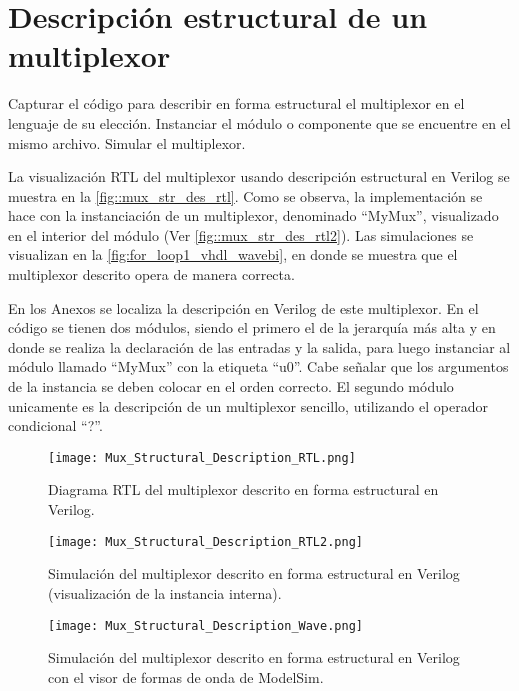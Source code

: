 \section{Descripción estructural de un multiplexor \label{sec:s1}}

\begin{center}
	\begin{minipage}{12cm}
		\begin{tcolorbox}[title=Actividad 1]
			Capturar el código para describir en forma estructural el multiplexor en el lenguaje de su elección. Instanciar el módulo o componente que se encuentre en el mismo archivo. Simular el multiplexor.
		\end{tcolorbox}	
	\end{minipage}
\end{center}

La visualización RTL del multiplexor usando descripción estructural en Verilog se muestra en la \autoref{fig::mux_str_des_rtl}. Como se observa, la implementación se hace con la instanciación de un multiplexor, denominado ``MyMux'', visualizado en el interior del módulo (Ver \autoref{fig::mux_str_des_rtl2}). Las simulaciones se visualizan en la \autoref{fig:for_loop1_vhdl_wavebi}, en donde se muestra que el multiplexor descrito opera de manera correcta.

En los Anexos se localiza la descripción en Verilog de este multiplexor. En el código se tienen dos módulos, siendo el primero el de la jerarquía más alta y en donde se realiza la declaración de las entradas y la salida, para luego instanciar al módulo llamado ``MyMux'' con la etiqueta ``u0''. Cabe señalar que los argumentos de la instancia se deben colocar en el orden correcto. El segundo módulo unicamente es la descripción de un multiplexor sencillo, utilizando el operador condicional ``?''.

\begin{figure}[ht]
	\centering
	\texttt{[image: Mux\_Structural\_Description\_RTL.png]}
	\caption{Diagrama RTL del multiplexor descrito en forma estructural en Verilog. \label{fig:mux_str_des_rtl}}
\end{figure}

\begin{figure}[ht]
	\centering
	\texttt{[image: Mux\_Structural\_Description\_RTL2.png]}
	\caption{Simulación del multiplexor descrito en forma estructural en Verilog (visualización de la instancia interna). \label{fig:mux_str_des_rtl2}}
\end{figure}

\begin{figure}[ht]
	\centering
	\texttt{[image: Mux\_Structural\_Description\_Wave.png]}
	\caption{Simulación del multiplexor descrito en forma estructural en Verilog con el visor de formas de onda de ModelSim. \label{fig:mux_str_des_wave}}
\end{figure}
